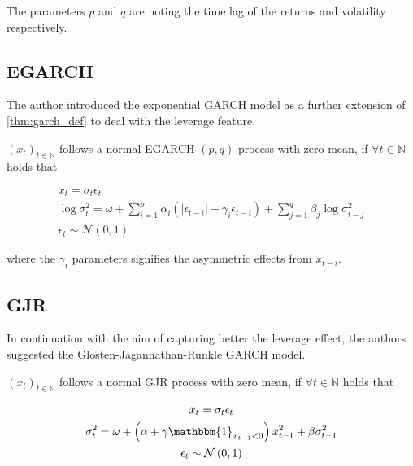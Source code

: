 \documentclass[a4paper, oneside]{discothesis}
\begin{document}
The parameters $p$ and $q$ are noting the time lag of the returns and volatility respectively.

\subsection{EGARCH}

The author \cite{egarch} introduced the exponential GARCH model as a further extension of \ref{thm:garch_def}  to deal with the leverage feature.

\begin{definition}\label{thm:egarch_def} $\left(x_t\right)_{t\in \mathbb{N}}$ follows a normal EGARCH $\left(p, q\right)$ process with zero mean, if $\forall t \in \mathbb{N}$ holds that

\begin{gather*}\label{eq:}
x_t = \sigma_t \epsilon_t \\
\log\sigma^2_t = \omega + \sum_{i=1}^p\alpha_i \left(|\epsilon_{t-i}|+\gamma_i\epsilon_{t-i}\right) + \sum_{j=1}^q \beta_j \log \sigma_{t-j}^2  \\
\epsilon_t \sim \mathcal{N}\left(0,1\right)
\end{gather*}

\end{definition}
where the $\gamma_i$ parameters signifies the asymmetric effects from $x_{t-i}$. 

\subsection{GJR}

In continuation with the aim of capturing better the leverage effect, the authors \cite{gjr} suggested the Glosten-Jagannathan-Runkle GARCH model. 

\begin{definition}[GJR]\label{thm:gjr} 
$\left(x_t\right)_{t\in \mathbb{N}}$ follows a normal GJR process with zero mean, if $\forall t \in \mathbb{N}$ holds that

\begin{gather*}\label{eq:}
x_t = \sigma_t \epsilon_t \\
\sigma^2_t = \omega + \left(\alpha+\gamma \mathbbm{1}_{x_{t-1}<0}\right)x_{t-1}^2+\beta \sigma_{t-1}^2 \\
\epsilon_t \sim \mathcal{N}\left(0,1\right)
\end{gather*}
\end{definition}
\end{document}
